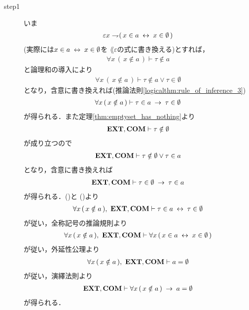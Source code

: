 	\begin{prf}\mbox{}
		\begin{description}
			\item[step1]
				いま
				\begin{align}
					\varepsilon x \rightharpoondown\hspace{-0.25em} (\, x \in a \hspace{0.25em}\leftrightarrow\hspace{0.25em} x \in \emptyset\, )
				\end{align}
				(実際には$x \in a \hspace{0.25em}\leftrightarrow\hspace{0.25em} x \in \emptyset$を
				$\lang{\varepsilon}$の式に書き換える)とすれば，
				\begin{align}
					\forall x\, (\, x \notin a\, ) \vdash \tau \notin a
				\end{align}
				と論理和の導入により
				\begin{align}
					\forall x\, (\, x \notin a\, ) \vdash 
					\tau \notin a \vee \tau \in \emptyset
				\end{align}
				となり，含意に書き換えれば(推論法則\ref{logicalthm:rule_of_inference_3})
				\begin{align}
					\forall x\, (\, x \notin a\, ) \vdash 
					\tau \in a \hspace{0.25em}\rightarrow\hspace{0.25em} \tau \in \emptyset
					\label{fom:uniqueness_of_emptyset_1}
				\end{align}
				が得られる．また定理\ref{thm:emptyset_has_nothing}より
				\begin{align}
					\mbox{{\bf EXT}},\mbox{\bf COM} \vdash \tau \notin \emptyset
				\end{align}
				が成り立つので
				\begin{align}
					\mbox{{\bf EXT}},\mbox{\bf COM} \vdash \tau \notin \emptyset \vee \tau \in a
				\end{align}
				となり，含意に書き換えれば
				\begin{align}
					\mbox{{\bf EXT}},\mbox{\bf COM} \vdash \tau \in \emptyset \hspace{0.25em}\rightarrow\hspace{0.25em} \tau \in a
					\label{fom:uniqueness_of_emptyset_2}
				\end{align}
				が得られる．()と
				()より
				\begin{align}
					\forall x\, (\, x \notin a\, ),\ \mbox{{\bf EXT}},\mbox{\bf COM} \vdash
					\tau \in a \hspace{0.25em}\leftrightarrow\hspace{0.25em} \tau \in \emptyset
				\end{align}
				が従い，全称記号の推論規則より
				\begin{align}
					\forall x\, (\, x \notin a\, ),\ \mbox{{\bf EXT}},\mbox{\bf COM} \vdash
					\forall x\, (\, x \in a \hspace{0.25em}\leftrightarrow\hspace{0.25em} x \in \emptyset\, )
				\end{align}
				が従い，外延性公理より
				\begin{align}
					\forall x\, (\, x \notin a\, ),\ \mbox{{\bf EXT}},\mbox{\bf COM} \vdash
					a = \emptyset
				\end{align}
				が従い，演繹法則より
				\begin{align}
					\mbox{{\bf EXT}},\mbox{\bf COM} \vdash
					\forall x\, (\, x \notin a\, ) \hspace{0.25em}\rightarrow\hspace{0.25em} a = \emptyset
				\end{align}
				が得られる．
				

\end{description}
\end{prf}
